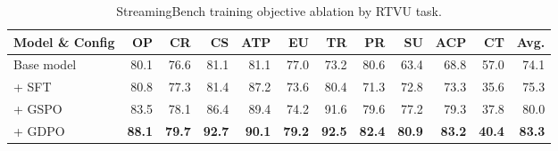 \begin{table}[!t]
  \centering
  \scriptsize
  \setlength{\tabcolsep}{4pt}
  \renewcommand{\arraystretch}{1.05}
  \begin{tabular}{@{}lrrrrrrrrrrr@{}}
    \hline
    Model \& Config & OP & CR & CS & ATP & EU & TR & PR & SU & ACP & CT & Avg. \\
    \hline
    Base model & 80.1 & 76.6 & 81.1 & 81.1 & 77.0 & 73.2 & 80.6 & 63.4 & 68.8 & 57.0 & 74.1 \\
    + SFT & 80.8 & 77.3 & 81.4 & 87.2 & 73.6 & 80.4 & 71.3 & 72.8 & 73.3 & 35.6 & 75.3 \\
    + GSPO & 83.5 & 78.1 & 86.4 & 89.4 & 74.2 & 91.6 & 79.6 & 77.2 & 79.3 & 37.8 & 80.0 \\
    \rowcolor{softblue}
    + GDPO & \textbf{88.1} & \textbf{79.7} & \textbf{92.7} & \textbf{90.1} & \textbf{79.2} & \textbf{92.5} & \textbf{82.4} & \textbf{80.9} & \textbf{83.2} & \textbf{40.4} & \textbf{83.3} \\
    \hline
  \end{tabular}
  \caption{StreamingBench training objective ablation by RTVU task.}
  \label{tab:streamingbench_train_ablation}
\end{table}

\begin{table}[!t]
  \centering
  \scriptsize
  \setlength{\tabcolsep}{2.2pt}
  \caption{OVO-Bench training objective ablation.}
  \label{tab:ovobench_train_ablation}
\end{table}

